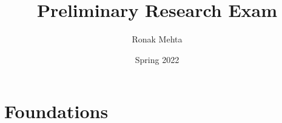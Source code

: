 \documentclass[10pt]{article}
\title{Preliminary Research Exam}
\author{Ronak Mehta}
\date{Spring 2022}
\theoremstyle{plain}
\theoremstyle{definition}
\theoremstyle{remark}
\begin{document}
\maketitle
{}

\tableofcontents
\newpage

\clearpage
\appendix

\section{Foundations}
\label{sec:foundation}
\end{document}
